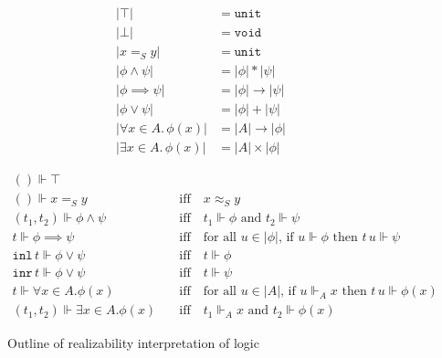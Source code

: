 \documentclass{article}
\newcommand{\ut}[1]{|#1|}
\newcommand{\per}[1]{\approx_{#1}}
\newcommand{\rz}{\Vdash}
\newcommand{\inl}[1]{\texttt{inl}\,#1}
\newcommand{\inr}[1]{\texttt{inr}\,#1}
\begin{document}
\begin{figure*}
  \centering
  \parbox[t]{0.35\textwidth}{
    \begin{align*}
      \ut{\top} &= \mathtt{unit} \\
      \ut{\bot} &= \mathtt{void} \\
      \ut{x =_S y} &= \mathtt{unit} \\
      \ut{\phi \land \psi} &= \ut{\phi} * \ut{\psi} \\
      \ut{\phi \implies \psi} &= \ut{\phi} \to \ut{\psi} \\
      \ut{\phi \lor \psi} &= \ut{\phi} + \ut{\psi} \\
      \ut{\forall x \in A .\, \phi(x)} &= \ut{A} \to \ut{\phi} \\
      \ut{\exists x \in A .\, \phi(x)} &= \ut{A} \times \ut{\phi}
    \end{align*}
  }
  \quad
  \parbox[t]{0.5\textwidth}{
    \begin{align*}
      () \rz \top &
      \\
      () \rz x =_S y
        &\quad\text{iff}\quad 
      x \per{S} y
      \\
      (t_1,t_2) \rz \phi \land \psi
        &\quad\text{iff}\quad
        \text{$t_1 \rz \phi$ and $t_2 \rz \psi$}
      \\
      t \rz \phi \implies \psi
        &\quad\text{iff}\quad
        \text{for all $u \in \ut{\phi}$, if $u \rz \phi$ then $t\,u
          \rz \psi$}
      \\
      \inl{t} \rz \phi \lor \psi
        &\quad\text{iff}\quad
        \text{$t \rz \phi$}
      \\
      \inr{t} \rz \phi \lor \psi
        &\quad\text{iff}\quad
        \text{$t \rz \psi$}
      \\
      t \rz \forall x \in A . \phi(x)
        &\quad\text{iff}\quad
        \text{for all $u \in \ut{A}$, if $u \rz_A x$ then $t\,u \rz \phi(x)$}
      \\
      (t_1, t_2) \rz \exists x \in A . \phi(x)
        &\quad\text{iff}\quad
        \text{$t_1 \rz_A x$ and $t_2 \rz \phi(x)$}
    \end{align*}
  }
  \caption{Outline of realizability interpretation of logic}
  \label{fig:rz-logic}
\end{figure*}
\end{document}
